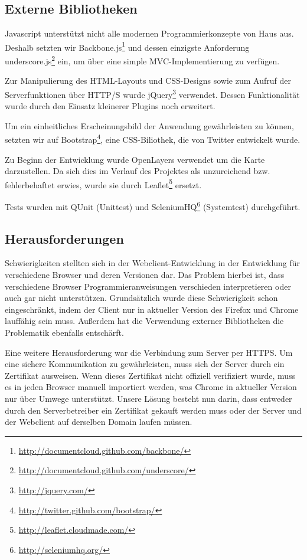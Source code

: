 \subsection*{Externe Bibliotheken}

Javascript unterstützt nicht alle modernen Programmierkonzepte von Haus aus.
Deshalb setzten wir Backbone.js\footnote{\url{http://documentcloud.github.com/backbone/}} und dessen einzigste Anforderung underscore.js\footnote{\url{http://documentcloud.github.com/underscore/}} ein, um über eine simple MVC-Implementierung zu verfügen.

Zur Manipulierung des HTML-Layouts und CSS-Designs sowie zum Aufruf der Serverfunktionen über HTTP/S wurde jQuery\footnote{\url{http://jquery.com/}} verwendet.
Dessen Funktionalität wurde durch den Einsatz kleinerer Plugins noch erweitert.

Um ein einheitliches Erscheinungsbild der Anwendung gewährleisten zu können, setzten wir auf Bootstrap\footnote{\url{http://twitter.github.com/bootstrap/}}, eine CSS-Biliothek, die von Twitter entwickelt wurde.

Zu Beginn der Entwicklung wurde OpenLayers verwendet um die Karte darzustellen. 
Da sich dies im Verlauf des Projektes als unzureichend bzw. fehlerbehaftet erwies, wurde sie durch Leaflet\footnote{\url{http://leaflet.cloudmade.com/}} ersetzt.

Tests wurden mit QUnit (Unittest) und SeleniumHQ\footnote{\url{http://seleniumhq.org/}} (Systemtest) durchgeführt.

\subsection*{Herausforderungen}

Schwierigkeiten stellten sich in der Webclient-Entwicklung in der Entwicklung für verschiedene Browser und deren Versionen dar.
Das Problem hierbei ist, dass verschiedene Browser Programmieranweisungen verschieden interpretieren oder auch gar nicht unterstützen. 
Grundsätzlich wurde diese Schwierigkeit schon eingeschränkt, indem der Client nur in aktueller Version des Firefox und Chrome lauffähig sein muss. Außerdem hat die Verwendung externer Bibliotheken die Problematik ebenfalls entschärft.

Eine weitere Herausforderung war die Verbindung zum Server per HTTPS.
Um eine sichere Kommunikation zu gewährleisten, muss sich der Server durch ein Zertifikat ausweisen.
Wenn dieses Zertifikat nicht offiziell verifiziert wurde, muss es in jeden Browser manuell importiert werden, was Chrome in aktueller Version nur über Umwege unterstützt.
Unsere Lösung besteht nun darin, dass entweder durch den Serverbetreiber ein Zertifikat gekauft werden muss oder der Server und der Webclient auf derselben Domain laufen müssen.
